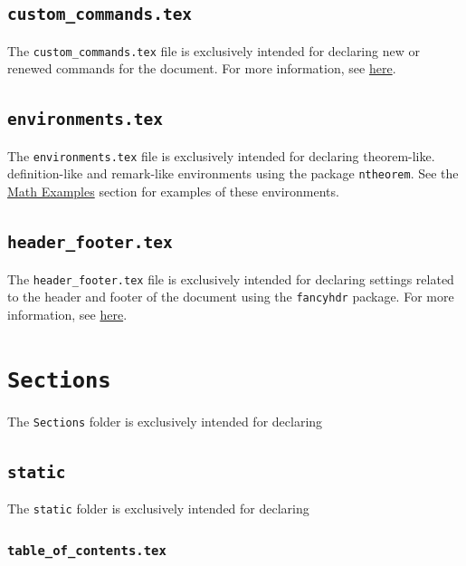 \subsection{\texttt{custom\_commands.tex}}
\label{sec:custom_commands.tex}

The \texttt{custom\_commands.tex} file is exclusively intended for declaring new or renewed commands for the document. For more information, see \href{https://en.wikibooks.org/wiki/LaTeX/Macros}{here}.

\subsection{\texttt{environments.tex}}
\label{sec:environments.tex}

The \texttt{environments.tex} file is exclusively intended for declaring theorem-like. definition-like and remark-like environments using the package \texttt{ntheorem}. See the \hyperref[sec:math_examples]{Math Examples} section for examples of these environments.

\subsection{\texttt{header\_footer.tex}}
\label{sec:header_footer.tex}

The \texttt{header\_footer.tex} file is exclusively intended for declaring settings related to the header and footer of the document using the \texttt{fancyhdr} package. For more information, see \href{https://en.wikibooks.org/wiki/LaTeX/Customizing_Page_Headers_and_Footers}{here}.

\section{\texttt{Sections}}
\label{sec:sections}

The \texttt{Sections} folder is exclusively intended for declaring 

\subsection{\texttt{static}}
\label{sec:static}

The \texttt{static} folder is exclusively intended for declaring 

\subsubsection{\texttt{table\_of\_contents.tex}}
\label{sec:table_of_contents.tex}

